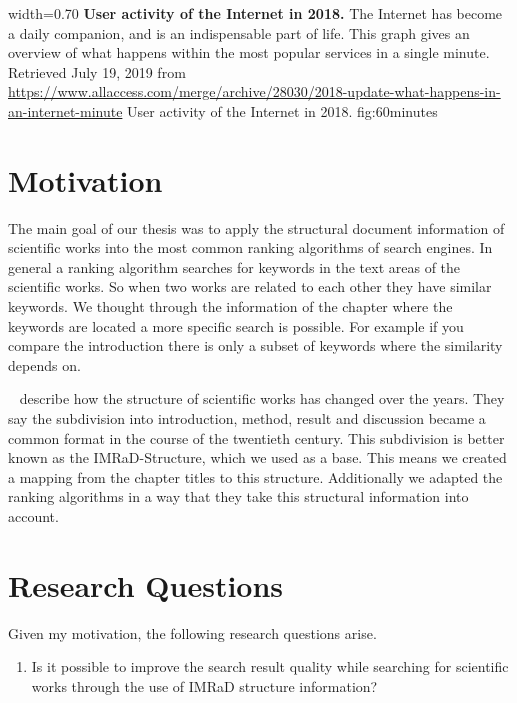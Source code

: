       {width=0.70\textwidth}
      {\textbf{User activity of the Internet in 2018.} The Internet has become a daily companion, and is an indispensable part of life. This graph gives an overview of what happens within the most popular services in a single minute. Retrieved July 19, 2019 from \url{https://www.allaccess.com/merge/archive/28030/2018-update-what-happens-in-an-internet-minute}}
      {User activity of the Internet in 2018.}
      {fig:60minutes}

\section{Motivation}
\label{sec:Motivation}

The main goal of our thesis was to apply the structural document information of scientific works into the most common ranking algorithms of search engines. In general a ranking algorithm searches for keywords in the text areas of the scientific works. So when two works are related to each other they have similar keywords. We thought through the information of the chapter where the keywords are located a more specific search is possible. For example if you compare the introduction there is only a subset of keywords where the similarity depends on.

 ~\cite{Sollaci-The-2004} describe how the structure of scientific works has changed over the years. They say the subdivision into introduction, method, result and discussion became a common format in the course of the twentieth century. This subdivision is better known as the IMRaD-Structure, which we used as a base. This means we created a mapping from the chapter titles to this structure. Additionally we adapted the ranking algorithms in a way that they take this structural information into account.


\section{Research Questions}
\label{sec:research_questions}

Given my motivation, the following research questions arise.

\begin{enumerate}
  \item Is it possible to improve the search result quality while searching for scientific works through the use of IMRaD structure information?
\end{enumerate}


